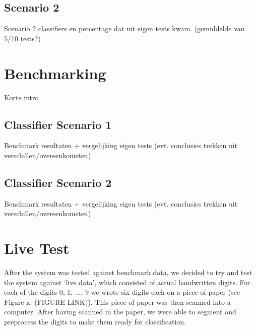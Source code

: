 \documentclass[11pt,twoside,a4paper]{article}
\begin{document}
\subsection{Scenario 2}
Scenario 2 classifiers en percentage dat uit eigen tests kwam. (gemiddelde van 5/10 tests?)



\section{Benchmarking}
Korte intro

\subsection{Classifier Scenario 1}
Benchmark resultaten + vergelijking eigen tests (evt. conclusies trekken uit verschillen/overeenkomsten)

\subsection{Classifier Scenario 2}
Benchmark resultaten + vergelijking eigen tests (evt. conclusies trekken uit verschillen/overeenkomsten)



\section{Live Test}
After the system was tested against benchmark data, we decided to try and test the system against `live data', which consisted of actual handwritten digits. For each of the digits 0, 1, ..., 9 we wrote six digits each on a piece of paper (see Figure x. (FIGURE LINK)). This piece of paper was then scanned into a computer. After having scanned in the paper, we were able to segment and preprocess the digits to make them ready for classification.
\end{document}
